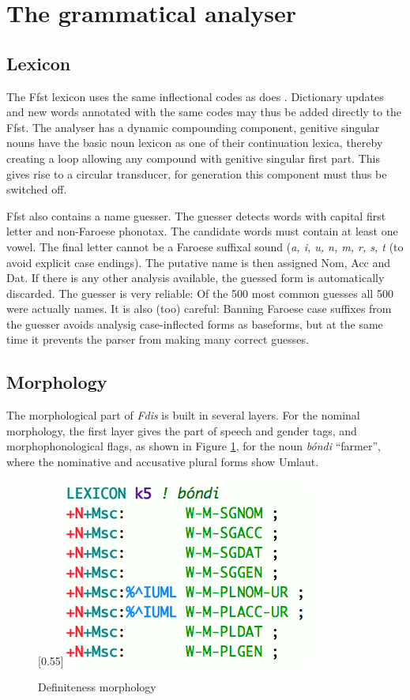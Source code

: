 \documentclass[11pt]{article}
\begin{document}
\section{The grammatical analyser}

\subsection{Lexicon}

The Ffst lexicon uses the same inflectional codes as does \cite{Poulsen98}.  Dictionary updates and new words annotated with the same codes may thus be added directly to the Ffst. The analyser has a dynamic compounding component, genitive singular nouns have the basic noun lexicon as one of their continuation lexica, thereby creating a loop allowing any compound with genitive singular first part. This gives rise to a circular transducer, for generation this component must thus be switched off.

Ffst also contains a name guesser. The guesser detects words with capital first letter and non-Faroese phonotax. The candidate words must contain at least one vowel. The final letter cannot be a Faroese suffixal sound (\textit{a, i, u, n, m, r, s, t} (to avoid explicit case endings). The putative name is then assigned Nom, Acc and Dat. If there is any other analysis available, the guessed form is automatically discarded. The guesser is very reliable: Of the 500 most common guesses all 500 were actually names. It is also (too) careful: Banning Faroese case suffixes from the guesser avoids analysig case-inflected forms as baseforms, but at the same time it prevents the parser from making many correct guesses. 


\subsection{Morphology}

The morphological part of \textit{Fdis} is built in several layers. For the nominal morphology, the first layer gives the part of speech and gender tags, and morphophonological flags, as shown in Figure \ref{bondi}, for the noun \textit{bóndi} “farmer”, where the nominative and accusative plural forms show Umlaut.

\begin{figure}[hp]
\begin{center}
\scalebox{0.55}[0.55]{\includegraphics{img/bondi.png}}
\caption{Definiteness morphology}
\label{bondi}
\end{center}
\end{figure}
\end{document}
